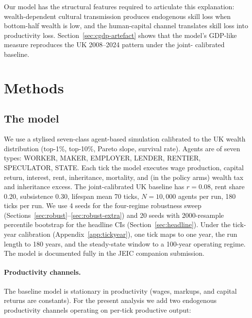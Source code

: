 \documentclass[11pt]{article}
\begin{document}
Our model has the structural features required to articulate this
explanation: wealth-dependent cultural transmission produces
endogenous skill loss when bottom-half wealth is low, and the
human-capital channel translates skill loss into productivity loss.
Section~\ref{sec:cgdp-artefact} shows that the model's GDP-like
measure reproduces the UK 2008--2024 pattern under the joint-
calibrated baseline.

\section{Methods}
\label{sec:methods}

\subsection{The model}

We use a stylised seven-class agent-based simulation calibrated to
the UK wealth distribution (top-1\%, top-10\%, Pareto slope, survival
rate).  Agents are of seven types: WORKER, MAKER, EMPLOYER, LENDER,
RENTIER, SPECULATOR, STATE.  Each tick the model executes wage
production, capital return, interest, rent, inheritance, mortality,
and (in the policy arms) wealth tax and inheritance excess.  The
joint-calibrated UK baseline has $r = 0.08$, rent share 0.20,
subsistence 0.30, lifespan mean 70 ticks, $N = 10{,}000$ agents per
run, 180 ticks per run.  We use 4 seeds for the four-regime
robustness sweep (Sections~\ref{sec:robust}--\ref{sec:robust-extra})
and 20 seeds with 2000-resample percentile bootstrap for the
headline CIs (Section~\ref{sec:headline}).  Under the tick-year
calibration (Appendix~\ref{app:tickyear}), one tick maps to one year,
the run length to 180 years, and the steady-state window to a 100-year
operating regime.  The model is documented fully in
the JEIC companion submission.

\paragraph{Productivity channels.}  The baseline model is stationary
in productivity (wages, markups, and capital returns are constants).
For the present analysis we add two endogenous productivity
channels operating on per-tick productive output:
\end{document}
